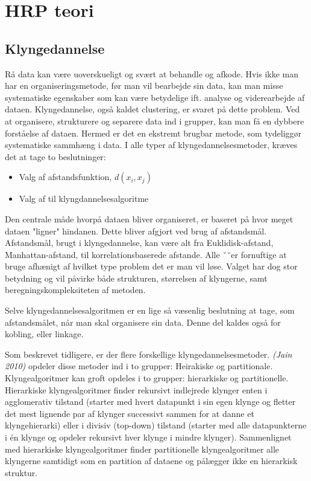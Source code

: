 \documentclass[../main.tex]{subfiles}
\begin{document}
\section{HRP teori}
\subsection{Klyngedannelse}
Rå data kan være uoverskueligt og svært at behandle og afkode. Hvis ikke man har en organiseringsmetode, før man vil bearbejde sin data, kan man misse systematiske egenskaber som kan være betydelige ift. analyse og viderearbejde af dataen.  Klyngedannelse, også kaldet clustering, er svaret på dette problem. Ved at organisere, strukturere og separere data ind i grupper, kan man få en dybbere forståelse af dataen. Hermed er det en ekstremt brugbar metode, som  tydeliggør systematiske sammhæng i data. I alle typer af klyngedannelsesmetoder, kræves det at tage to beslutninger:

\begin{itemize}
    \item Valg af afstandsfunktion, $\textit{d}(x_i, x_j)$ 
    \item Valg af til klyngdannelsesalgoritme
\end{itemize}

Den centrale måde hvorpå dataen bliver organiseret, er baseret på hvor meget dataen "ligner" hindanen. Dette bliver afgjort ved brug af afstandsmål. Afstandsmål, brugt i klyngedannelse, kan være alt fra Euklidisk-afstand, Manhattan-afstand, til korrelationsbaserede afstande. Alle ˇˇer fornuftige at bruge afhænigt af hvilket type problem det er man vil løse. 
Valget har dog stor betydning og vil påvirke både strukturen, størrelsen af klyngerne, samt beregningskompleksiteten af metoden.

Selve klyngedannelsesalgoritmen er en lige så væsenlig beslutning at tage, som afstandsmålet, når man skal organisere sin data. Denne del kaldes også for kobling, eller linkage. 

Som beskrevet tidligere, er der flere forskellige klyngedannelsesmetoder. \textit{(Jain 2010) }opdeler disse metoder ind i to grupper: Heirakiske og partitionale.
Klyngealgoritmer kan groft opdeles i to grupper: hierarkiske og partitionelle. Hierarkiske klyngealgoritmer finder rekursivt indlejrede klynger enten i agglomerativ tilstand (starter med hvert datapunkt i sin egen klynge og fletter det mest lignende par af klynger successivt sammen for at danne et klyngehierarki) eller i divisiv (top-down) tilstand (starter med alle datapunkterne i én klynge og opdeler rekursivt hver klynge i mindre klynger). Sammenlignet med hierarkiske klyngealgoritmer finder partitionelle klyngealgoritmer alle klyngerne samtidigt som en partition af dataene og pålægger ikke en hierarkisk struktur.
\end{document}

